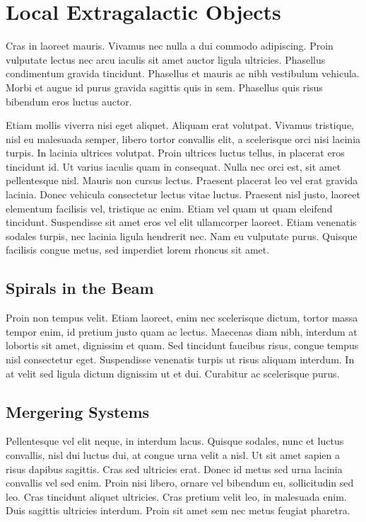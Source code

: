 \documentclass[usenatbib]{mn2e}
\begin{document}
\section{Local Extragalactic Objects}
Cras in laoreet mauris. Vivamus nec nulla a dui commodo adipiscing. Proin vulputate lectus nec arcu iaculis sit amet auctor ligula ultricies. Phasellus condimentum gravida tincidunt. Phasellus et mauris ac nibh vestibulum vehicula. Morbi et augue id purus gravida sagittis quis in sem. Phasellus quis risus bibendum eros luctus auctor.

Etiam mollis viverra nisi eget aliquet. Aliquam erat volutpat. Vivamus tristique, nisl eu malesuada semper, libero tortor convallis elit, a scelerisque orci nisi lacinia turpis. In lacinia ultrices volutpat. Proin ultrices luctus tellus, in placerat eros tincidunt id. Ut varius iaculis quam in consequat. Nulla nec orci est, sit amet pellentesque nisl. Mauris non cursus lectus. Praesent placerat leo vel erat gravida lacinia. Donec vehicula consectetur lectus vitae luctus. Praesent nisl justo, laoreet elementum facilisis vel, tristique ac enim. Etiam vel quam ut quam eleifend tincidunt. Suspendisse sit amet eros vel elit ullamcorper laoreet. Etiam venenatis sodales turpis, nec lacinia ligula hendrerit nec. Nam eu vulputate purus. Quisque facilisis congue metus, sed imperdiet lorem rhoncus sit amet.

\subsection{Spirals in the Beam}
Proin non tempus velit. Etiam laoreet, enim nec scelerisque dictum, tortor massa tempor enim, id pretium justo quam ac lectus. Maecenas diam nibh, interdum at lobortis sit amet, dignissim et quam. Sed tincidunt faucibus risus, congue tempus nisl consectetur eget. Suspendisse venenatis turpis ut risus aliquam interdum. In at velit sed ligula dictum dignissim ut et dui. Curabitur ac scelerisque purus.

\subsection{Mergering Systems}
Pellentesque vel elit neque, in interdum lacus. Quisque sodales, nunc et luctus convallis, nisl dui luctus dui, at congue urna velit a nisl. Ut sit amet sapien a risus dapibus sagittis. Cras sed ultricies erat. Donec id metus sed urna lacinia convallis vel sed enim. Proin nisi libero, ornare vel bibendum eu, sollicitudin sed leo. Cras tincidunt aliquet ultricies. Cras pretium velit leo, in malesuada enim. Duis sagittis ultricies interdum. Proin sit amet sem nec metus feugiat pharetra.
\end{document}
